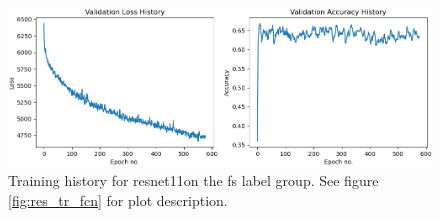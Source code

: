 \begin{figure}[h]
    \centering
    \includegraphics[width=\textwidth]{figures/res_tr_ResNet11_state.png}
    \caption{Training history for \acrlong{resnet11}on the \acrshort{fs} label group. See figure \ref{fig:res_tr_fcn} for plot description.}
    \label{fig:res_tr_resnet11}
\end{figure}
\FloatBarrier


